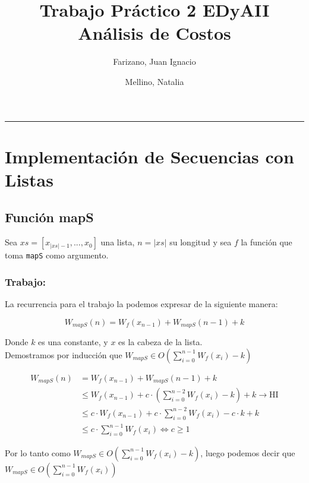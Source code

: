 \documentclass[11pt]{article}
\title{Trabajo Práctico 2 EDyAII \\
        \large Análisis de Costos
}
\author{Farizano, Juan Ignacio \and Mellino, Natalia}
\date{}
\begin{document}
\maketitle

\noindent\rule{\textwidth}{1pt}
\section{Implementación de Secuencias con Listas}


\subsection{Función mapS}
Sea $xs = [x_{\vert xs \vert -1},...,x_0]$ una lista, $n = \vert xs \vert$ su longitud
y sea $f$ la función que toma \texttt{mapS} como argumento. 

\subsubsection{Trabajo:}
La recurrencia para el trabajo la podemos expresar de la siguiente manera:

\begin{equation*}
    W_{mapS}(n) = W_f(x_{n- 1}) + W_{mapS}(n - 1) + k
\end{equation*}

Donde $k$ es una constante, y $x$ es la cabeza de la lista. \\

Demostramos por inducción que $ W_{mapS} \in O\left(\displaystyle\sum_{i=0}^{n - 1}W_f(x_i) - k\right) $

\begin{align*}
    W_{mapS}(n) & = W_f(x_{n - 1}) + W_{mapS}(n - 1) + k \\
               & \leq W_f(x_{n - 1}) + c \cdot (\displaystyle\sum_{i=0}^{n - 2}W_f(x_i) - k) + k \rightarrow \text{HI} \\
               & \leq c \cdot  W_f(x_{n - 1}) + c \cdot \displaystyle\sum_{i=0}^{n - 2}W_f(x_i) - c \cdot k + k \\
               & \leq c \cdot \displaystyle\sum_{i=0}^{n - 1}W_f(x_i) \iff c \geq 1
\end{align*}

Por lo tanto como $ W_{mapS} \in O\left(\displaystyle\sum_{i=0}^{n - 1}W_f(x_i) - k\right) $,
luego podemos decir que $ W_{mapS} \in O\left(\displaystyle\sum_{i=0}^{n - 1}W_f(x_i)\right) $
\end{document}
